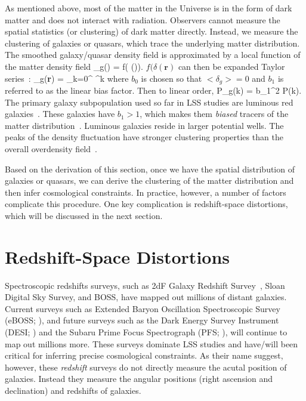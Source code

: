 As mentioned above, most of the matter in the Universe is in the form of dark 
matter and does not interact with radiation. Observers cannot measure the 
spatial statistics (or clustering) of dark matter directly. 
Instead, we measure the clustering of galaxies or quasars, which trace
the underlying matter distribution. The smoothed galaxy/quasar density field is 
approximated by a local function of the matter density field
\beq
\delta_g() = f( \delta()). 
\eeq
$f(\delta(\bm{r})$ can then be expanded Taylor series~\citep{Fry:1993}:
\beq
\delta_g({\bf r}) = \sum\limits_{k=0}^{\infty}  \delta^k 
\eeq
where $b_0$ is chosen so that $<\delta_g> = 0$ and $b_1$ is referred to as 
the linear bias factor. Then to linear order, 
\beq
P_g(k) = b_1^2 P(k). 
\eeq
The primary galaxy subpopulation used so far in LSS studies are luminous 
red galaxies~\citep{Eisenstein:2001aa, Dawson:2013aa}. These galaxies have $b_1 > 1$,
which makes them {\em biased} tracers of the matter 
distribution~\citep{Zehavi:2005aa, Sheldon:2009aa,Gaztanaga:2009aa, Zhai:2016aa}.
Luminous galaxies reside in larger potential wells. The peaks of the density fluctuation
have stronger clustering properties than the overall overdensity field~\citep{Manera:2010aa}.

Based on the derivation of this section, once we have the spatial 
distribution of galaxies or quasars, we can derive the clustering of the matter
distribution and then infer cosmological constraints. In practice, however, a
number of factors complicate this procedure. One key complication is redshift-space
distortions, which will be discussed in the next section.

\section{Redshift-Space Distortions} \label{sec:rsd}
Spectroscopic redshifts surveys, such as 2dF Galaxy Redshift Survey~\citep{Colless:1999aa}, 
Sloan Digital Sky Survey, and BOSS, have mapped out millions of distant galaxies. 
Current surveys such as Extended Baryon Oscillation 
Spectroscopic Survey (eBOSS; \citealt{Dawson:2015aa}), and future surveys such as 
the Dark Energy Survey Instrument (DESI; \citealt{Schlegel:2011aa, Morales:2012aa, Makarem:2014aa}) 
and the Subaru Prime Focus Spectrograph (PFS; \citealt{Takada:2014aa}), will 
continue to map out millions more. These surveys dominate LSS studies and have/will 
been critical for inferring precise cosmological constraints. As their name suggest, 
however, these {\em redshift} surveys do not directly measure the acutal position of 
galaxies. Instead they measure the angular positions (right ascension and declination) 
and redshifts of galaxies. 

